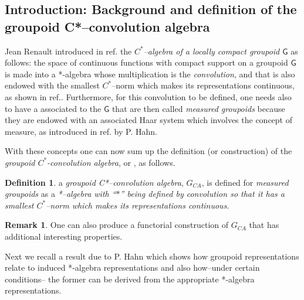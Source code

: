 \documentclass[12pt]{article}
\theoremstyle{plain}
\theoremstyle{definition}
\newtheorem{definition}{Definition}[section]
\newtheorem{remark}{Remark}[section]
\numberwithin{equation}{section}
\newcommand{\grp}{{\mathsf{G}}}
\newcommand{\<}{{\langle}}
\begin{document}
\subsection{Introduction: Background and definition of the groupoid C*--convolution algebra}

 Jean Renault introduced in ref. \cite{JR80} the \emph{$C^*$--algebra of a locally compact groupoid $\grp$} as follows: the space of continuous functions with compact support on a groupoid $\grp$ is made into a *-algebra whose multiplication is the \emph{convolution}, and that is also endowed with the smallest $C^*$--norm which makes its representations continuous,  as shown in ref.\cite{MAB2k3}. Furthermore, for this convolution to be defined, one needs also to have a  
associated to the  $\grp$ 
that are then called \emph{measured groupoids} because they are endowed with an associated Haar system which involves the concept of measure, as introduced in ref. \cite{Hahn1} by P. Hahn.

 With these concepts one can now sum up the definition (or construction) of the \emph{groupoid $C^*$-convolution algebra}, or , as follows.

\begin{definition}  a {\em groupoid C*--convolution algebra}, $G_{CA}$, is defined for \emph{measured groupoids}
as a \emph{*--algebra with ``$*$'' being defined by convolution so that it has a smallest $C^*$--norm which makes its representations continuous}.
\end{definition}

\begin{remark}
One can also produce a functorial construction of $G_{CA}$ that has additional interesting properties. 
\end{remark}

Next we recall a result due to P. Hahn \cite{PH78} which shows how groupoid representations relate to
induced *-algebra representations and also how--under certain conditions-- the former can be derived from
the appropriate *-algebra representations. 
\end{document}
